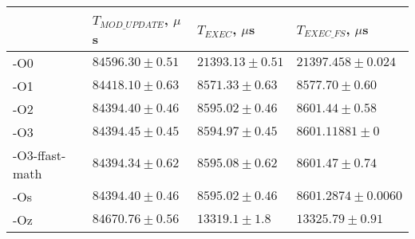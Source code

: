 \begin{tabular}{llll}
\toprule
 & $T_{MOD\_UPDATE}$, $\mu$s & $T_{EXEC}$, $\mu$s & $T_{EXEC\_FS}$, $\mu$s \\
\midrule
-O0 & $84596.30 \pm 0.51$ & $21393.13 \pm 0.51$ & $21397.458 \pm 0.024$ \\
-O1 & $84418.10 \pm 0.63$ & $8571.33 \pm 0.63$ & $8577.70 \pm 0.60$ \\
-O2 & $84394.40 \pm 0.46$ & $8595.02 \pm 0.46$ & $8601.44 \pm 0.58$ \\
-O3 & $84394.45 \pm 0.45$ & $8594.97 \pm 0.45$ & $8601.11881 \pm 0$ \\
-O3-ffast-math & $84394.34 \pm 0.62$ & $8595.08 \pm 0.62$ & $8601.47 \pm 0.74$ \\
-Os & $84394.40 \pm 0.46$ & $8595.02 \pm 0.46$ & $8601.2874 \pm 0.0060$ \\
-Oz & $84670.76 \pm 0.56$ & $13319.1 \pm 1.8$ & $13325.79 \pm 0.91$ \\
\bottomrule
\end{tabular}
